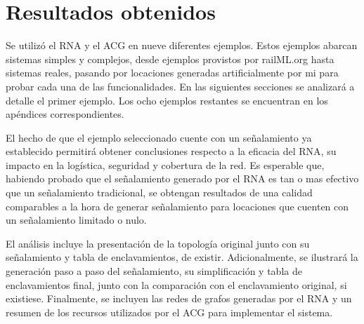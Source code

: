 \chapter{Resultados obtenidos}
	\label{sec:resultados}

	Se utilizó el RNA y el ACG en nueve diferentes ejemplos. Estos ejemplos abarcan sistemas simples y complejos, desde ejemplos provistos por railML.org hasta sistemas reales, pasando por locaciones generadas artificialmente por mi para probar cada una de las funcionalidades. En las siguientes secciones se analizará a detalle el primer ejemplo. Los ocho ejemplos restantes se encuentran en los apéndices correspondientes.
	
	El hecho de que el ejemplo seleccionado cuente con un señalamiento ya establecido permitirá obtener conclusiones respecto a la eficacia del RNA, su impacto en la logística, seguridad y cobertura de la red. Es esperable que, habiendo probado que el señalamiento generado por el RNA es tan o mas efectivo que un señalamiento tradicional, se obtengan resultados de una calidad comparables a la hora de generar señalamiento para locaciones que cuenten con un señalamiento limitado o nulo.	
	
	El análisis incluye la presentación de la topología original junto con su señalamiento y tabla de enclavamientos, de existir. Adicionalmente, se ilustrará la generación paso a paso del señalamiento, su simplificación y tabla de enclavamientos final, junto con la comparación con el enclavamiento original, si existiese. Finalmente, se incluyen las redes de grafos generadas por el RNA y un resumen de los recursos utilizados por el ACG para implementar el sistema.	


%
%
%
%
%
%
%
%